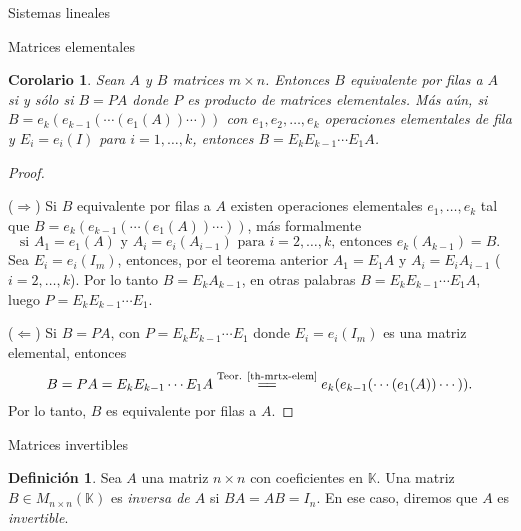 \documentclass[a4paper,12pt,twoside,spanish]{amsbook}
\newtheorem{corolario}[teorema]{Corolario}
\theoremstyle{definition}
\newtheorem{definicion}{Definici\'on}[section]
\theoremstyle{remark}
\newcommand{\K}{\mathbb K}
\begin{document}
\begin{chapter}{Sistemas lineales}
\begin{section}{Matrices elementales}
			
			
			
			\begin{corolario}\label{coro-mrtx-elem}
				Sean $A$ y $B$ matrices $m \times n$. Entonces $B$ equivalente por filas a $A$ si y sólo si $B=PA$ donde $P$ es  producto de matrices elementales. Más aún, si $B = e_k(e_{k-1}(\cdots(e_1(A))\cdots))$ con $e_1,e_2,\ldots,e_k$ operaciones elementales de fila y $E_i=e_i(I)$ para $i=1,\ldots,k$,  entonces $B =  E_kE_{k-1}\cdots E_1A$.
			\end{corolario}
			\begin{proof} 
				\
				
				($\Rightarrow$) Si $B$ equivalente por filas a $A$  existen operaciones elementales $e_1,\ldots,e_k$ tal que $B = e_k(e_{k-1}(\cdots(e_1(A))\cdots))$, más formalmente
				\begin{equation*}
				\text{si } A_1 = e_1(A)\text{ y } A_i = e_i(A_{i-1})\text{ para }i=2,\ldots,k\text{, entonces } e_k(A_{k-1})= B.
				\end{equation*}
				Sea $E_i = e_i(I_m)$, entonces, por el teorema anterior $A_1= E_1A$ y $A_i = E_iA_{i-1}$ ($i=2,\ldots,k$). Por  lo tanto $B=E_kA_{k-1}$, en otras palabras $B =  E_kE_{k-1}\cdots E_1A$, luego $P = E_kE_{k-1}\cdots E_1$.
				
				($\Leftarrow$) Si $B= PA$, con  $P = E_kE_{k-1}\cdots E_1$ donde $E_i=e_i(I_m)$ es una matriz elemental,  entonces
				$$
				B = PA = E_kE_{k-1}\cdots E_1A \stackrel{\text{Teor. \ref{th-mrtx-elem}}}{=\joinrel=}  e_k(e_{k-1}(\cdots(e_1(A))\cdots)). 
				$$
				Por lo tanto, $B$ es equivalente por filas a $A$.
			\end{proof} 
			
		\end{section}
		
		\begin{section}{Matrices invertibles}
			\begin{definicion} Sea $A$ una  matriz $n \times n$ con coeficientes en $\K$. Una matriz $B \in M_{n\times n}(\K)$  es \textit{inversa  de $A$} si $BA=AB=I_n$. En  ese caso,  diremos que  $A$ es \textit{invertible}.
			\end{definicion}
			

\end{section}
\end{chapter}
\end{document}
